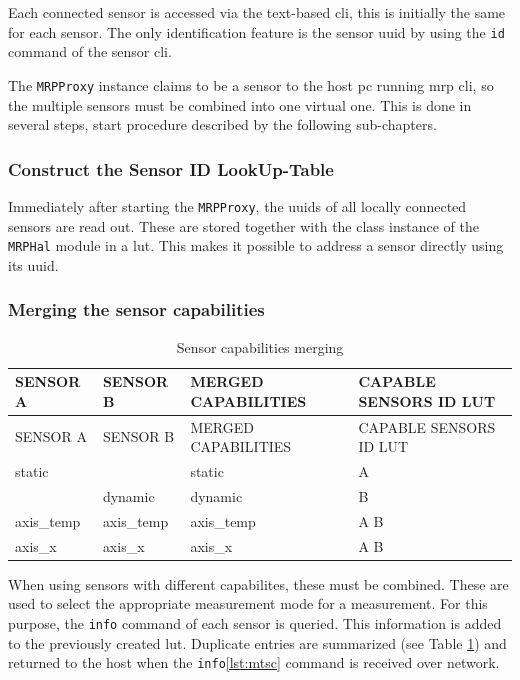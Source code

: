 Each connected sensor is accessed via the text-based \gls{cli}, this is
initially the same for each sensor. The only identification feature is
the sensor \gls{uuid} by using the \passthrough{\lstinline!id!} command
of the sensor \gls{cli}.

The \passthrough{\lstinline!MRPProxy!} instance claims to be a sensor to
the host \gls{pc} running \gls{mrp} \gls{cli}, so the multiple sensors
must be combined into one virtual one. This is done in several steps,
start procedure described by the following sub-chapters.

\hypertarget{construct-the-sensor-id-lookup-table}{%
\subsubsection{Construct the Sensor ID
LookUp-Table}\label{construct-the-sensor-id-lookup-table}}

Immediately after starting the \passthrough{\lstinline!MRPProxy!}, the
\gls{uuid}s of all locally connected sensors are read out. These are
stored together with the class instance of the
\passthrough{\lstinline!MRPHal!} module in a \gls{lut}. This makes it
possible to address a sensor directly using its \gls{uuid}.

\hypertarget{merging-the-sensor-capabilities}{%
\subsubsection{Merging the sensor
capabilities}\label{merging-the-sensor-capabilities}}

\begin{longtable}[]{@{}llll@{}}
\caption{Sensor capabilities merging
\label{Sensor_capabilities_merging.csv}}\tabularnewline
\toprule
SENSOR A & SENSOR B & MERGED CAPABILITIES & CAPABLE SENSORS ID
LUT\tabularnewline
\midrule
\endfirsthead
\toprule
SENSOR A & SENSOR B & MERGED CAPABILITIES & CAPABLE SENSORS ID
LUT\tabularnewline
\midrule
\endhead
static & & static & A\tabularnewline
& dynamic & dynamic & B\tabularnewline
axis\_temp & axis\_temp & axis\_temp & A B\tabularnewline
axis\_x & axis\_x & axis\_x & A B\tabularnewline
\bottomrule
\end{longtable}

When using sensors with different capabilites, these must be combined.
These are used to select the appropriate measurement mode for a
measurement. For this purpose, the \passthrough{\lstinline!info!}
command of each sensor is queried. This information is added to the
previously created \gls{lut}. Duplicate entries are summarized (see
Table \ref{Sensor_capabilities_merging.csv}) and returned to the host
when the \passthrough{\lstinline!info!}\ref{lst:mtsc} command is
received over network.

